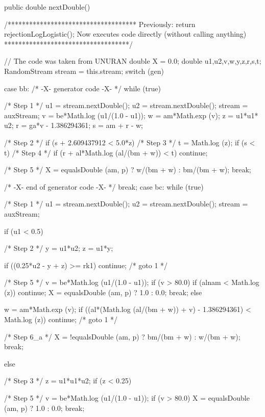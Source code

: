 \begin{code}\begin{hide}
    
   public double nextDouble() {
     /************************************
      Previously: return rejectionLogLogistic();
      Now executes code directly (without calling anything)
      ***********************************/

      // The code was taken from UNURAN
      double X = 0.0;
      double u1,u2,v,w,y,z,r,s,t;
      RandomStream stream = this.stream;
      switch (gen) {
      case bb:
         /* -X- generator code -X- */
         while (true) {
            /* Step 1 */
            u1 = stream.nextDouble();
            u2 = stream.nextDouble();
            stream = auxStream;
            v = be*Math.log (u1/(1.0 - u1));
            w = am*Math.exp (v);
            z = u1*u1* u2;
            r = ga*v - 1.386294361;
            s = am + r - w;

            /* Step 2 */
            if (s + 2.609437912 < 5.0*z) {
               /* Step 3 */
               t = Math.log (z);
               if (s < t)
                  /* Step 4 */
                  if (r + al*Math.log (al/(bm + w)) < t) 
                     continue;
               }

            /* Step 5 */
            X = equalsDouble (am, p) ? w/(bm + w) : bm/(bm + w);
            break;
         }
         /* -X- end of generator code -X- */
         break;
      case bc:
         while (true) {
            /* Step 1 */
            u1 = stream.nextDouble();
            u2 = stream.nextDouble();
            stream = auxStream;

            if (u1 < 0.5) {
               /* Step 2 */
               y = u1*u2;
               z = u1*y;

               if ((0.25*u2 - y + z) >= rk1) 
                  continue;  /* goto 1 */

               /* Step 5 */
               v = be*Math.log (u1/(1.0 - u1));
               if (v > 80.0) {
                  if (alnam < Math.log (z))
                     continue;
                  X = equalsDouble (am, p) ? 1.0 : 0.0;
                  break;
               }
               else {
                  w = am*Math.exp (v);
                  if ((al*(Math.log (al/(bm + w)) + v) - 1.386294361) <
                                                                 Math.log (z))
                     continue;  /* goto 1 */

                  /* Step 6_a */
                  X = !equalsDouble (am, p) ? bm/(bm + w) : w/(bm + w);
                  break;
               }
            }
            else {
               /* Step 3 */
               z = u1*u1*u2;
               if (z < 0.25) {
                  /* Step 5 */
                  v = be*Math.log (u1/(1.0 - u1));
                  if (v > 80.0) {
                     X = equalsDouble (am, p) ? 1.0 : 0.0;
                     break;
                  }

}}}}}
\end{hide}
\end{code}
